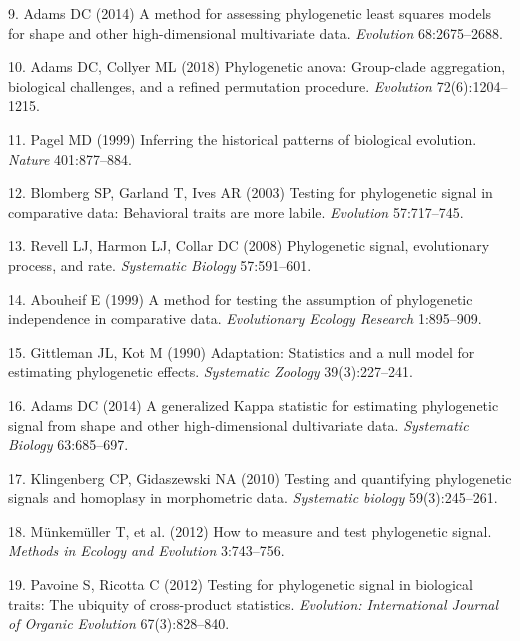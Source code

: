 \documentclass[9pt,twocolumn,twoside,lineno]{pnas-new}
\begin{document}
\leavevmode\hypertarget{ref-Adams2014b}{}%
9. Adams DC (2014) A method for assessing phylogenetic least squares
models for shape and other high-dimensional multivariate data.
\emph{Evolution} 68:2675--2688.

\leavevmode\hypertarget{ref-AdamsCollyer2018b}{}%
10. Adams DC, Collyer ML (2018) Phylogenetic anova: Group-clade
aggregation, biological challenges, and a refined permutation procedure.
\emph{Evolution} 72(6):1204--1215.

\leavevmode\hypertarget{ref-Pagel1999}{}%
11. Pagel MD (1999) Inferring the historical patterns of biological
evolution. \emph{Nature} 401:877--884.

\leavevmode\hypertarget{ref-Blomberg_et_al2003}{}%
12. Blomberg SP, Garland T, Ives AR (2003) Testing for phylogenetic
signal in comparative data: Behavioral traits are more labile.
\emph{Evolution} 57:717--745.

\leavevmode\hypertarget{ref-Revell_et_al2008}{}%
13. Revell LJ, Harmon LJ, Collar DC (2008) Phylogenetic signal,
evolutionary process, and rate. \emph{Systematic Biology} 57:591--601.

\leavevmode\hypertarget{ref-Abouheif1999}{}%
14. Abouheif E (1999) A method for testing the assumption of
phylogenetic independence in comparative data. \emph{Evolutionary
Ecology Research} 1:895--909.

\leavevmode\hypertarget{ref-Gittleman1990}{}%
15. Gittleman JL, Kot M (1990) Adaptation: Statistics and a null model
for estimating phylogenetic effects. \emph{Systematic Zoology}
39(3):227--241.

\leavevmode\hypertarget{ref-Adams2014a}{}%
16. Adams DC (2014) A generalized Kappa statistic for estimating
phylogenetic signal from shape and other high-dimensional dultivariate
data. \emph{Systematic Biology} 63:685--697.

\leavevmode\hypertarget{ref-Klingenberg2010}{}%
17. Klingenberg CP, Gidaszewski NA (2010) Testing and quantifying
phylogenetic signals and homoplasy in morphometric data.
\emph{Systematic biology} 59(3):245--261.

\leavevmode\hypertarget{ref-Munkemuller_et_al2012}{}%
18. Münkemüller T, et al. (2012) How to measure and test phylogenetic
signal. \emph{Methods in Ecology and Evolution} 3:743--756.

\leavevmode\hypertarget{ref-Pavoine2012}{}%
19. Pavoine S, Ricotta C (2012) Testing for phylogenetic signal in
biological traits: The ubiquity of cross-product statistics.
\emph{Evolution: International Journal of Organic Evolution}
67(3):828--840.
\end{document}
